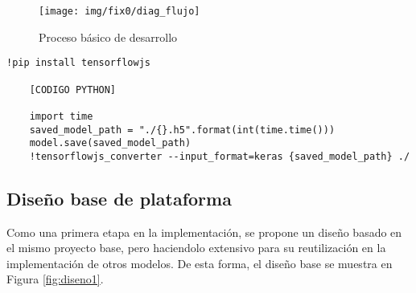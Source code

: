 \begin{figure}[H]
  \texttt{[image: img/fix0/diag\_flujo]}
  \centering
  \caption{Proceso básico de desarrollo}
  \label{fig:proceso}
\end{figure}


\begin{center}
  \lstset{style=custom_python}
  \begin{lstlisting}[caption=Código base en Python para convertir modelos, label=codConv]
    !pip install tensorflowjs

    [CODIGO PYTHON]

    import time
    saved_model_path = "./{}.h5".format(int(time.time()))
    model.save(saved_model_path)
    !tensorflowjs_converter --input_format=keras {saved_model_path} ./
  \end{lstlisting}
  \end{center}















\clearpage
\subsection{Diseño base de plataforma}

Como una primera etapa en la implementación, se propone un diseño basado en el mismo proyecto base, pero haciendolo extensivo para su reutilización en la implementación de otros modelos. De esta forma, el diseño base se muestra en Figura \ref{fig:diseno1}.

